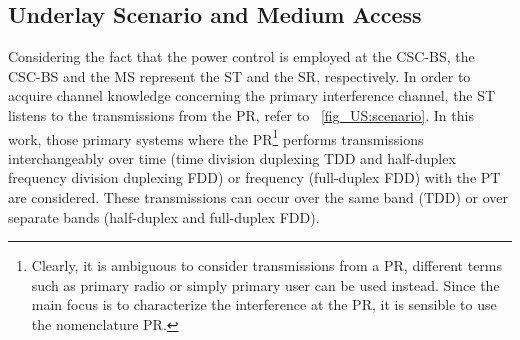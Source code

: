 \subsection{Underlay Scenario and Medium Access}

Considering the fact that the power control is employed at the CSC-BS, the CSC-BS and the MS represent the ST and the SR, respectively. In order to acquire channel knowledge concerning the primary interference channel, the ST listens to the transmissions from the PR, refer to \figurename~\ref{fig_US:scenario}. In this work, those primary systems where the PR\footnote{Clearly, it is ambiguous to consider transmissions from a PR, different terms such as primary radio or simply primary user can be used instead. Since the main focus is to characterize the interference at the PR, it is sensible to use the nomenclature PR.} performs transmissions interchangeably over time (time division duplexing TDD and half-duplex frequency division duplexing FDD) or frequency (full-duplex FDD) with the PT are considered. These transmissions can occur over the same band (TDD) or over separate bands (half-duplex and full-duplex FDD). 


